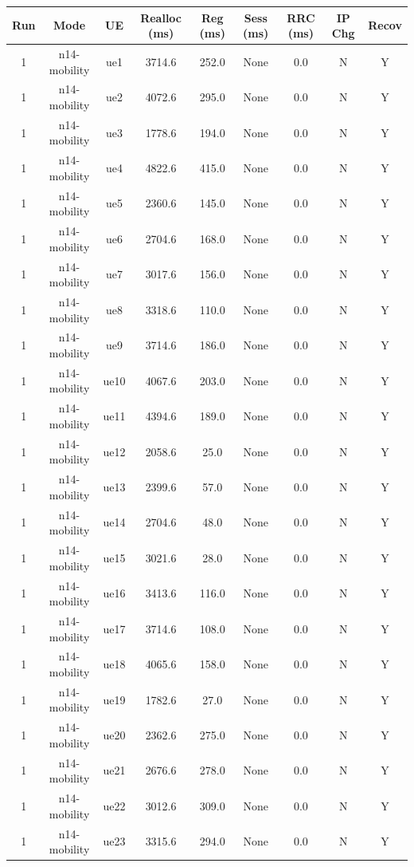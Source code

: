 \begin{table}[ht]
\centering
\begin{tabular}{|c|c|c|c|c|c|c|c|c|}
\hline
Run & Mode & UE & Realloc (ms) & Reg (ms) & Sess (ms) & RRC (ms) & IP Chg & Recov \\
\hline
1 & n14-mobility & ue1 & 3714.6 & 252.0 & None & 0.0 & N & Y \\
1 & n14-mobility & ue2 & 4072.6 & 295.0 & None & 0.0 & N & Y \\
1 & n14-mobility & ue3 & 1778.6 & 194.0 & None & 0.0 & N & Y \\
1 & n14-mobility & ue4 & 4822.6 & 415.0 & None & 0.0 & N & Y \\
1 & n14-mobility & ue5 & 2360.6 & 145.0 & None & 0.0 & N & Y \\
1 & n14-mobility & ue6 & 2704.6 & 168.0 & None & 0.0 & N & Y \\
1 & n14-mobility & ue7 & 3017.6 & 156.0 & None & 0.0 & N & Y \\
1 & n14-mobility & ue8 & 3318.6 & 110.0 & None & 0.0 & N & Y \\
1 & n14-mobility & ue9 & 3714.6 & 186.0 & None & 0.0 & N & Y \\
1 & n14-mobility & ue10 & 4067.6 & 203.0 & None & 0.0 & N & Y \\
1 & n14-mobility & ue11 & 4394.6 & 189.0 & None & 0.0 & N & Y \\
1 & n14-mobility & ue12 & 2058.6 & 25.0 & None & 0.0 & N & Y \\
1 & n14-mobility & ue13 & 2399.6 & 57.0 & None & 0.0 & N & Y \\
1 & n14-mobility & ue14 & 2704.6 & 48.0 & None & 0.0 & N & Y \\
1 & n14-mobility & ue15 & 3021.6 & 28.0 & None & 0.0 & N & Y \\
1 & n14-mobility & ue16 & 3413.6 & 116.0 & None & 0.0 & N & Y \\
1 & n14-mobility & ue17 & 3714.6 & 108.0 & None & 0.0 & N & Y \\
1 & n14-mobility & ue18 & 4065.6 & 158.0 & None & 0.0 & N & Y \\
1 & n14-mobility & ue19 & 1782.6 & 27.0 & None & 0.0 & N & Y \\
1 & n14-mobility & ue20 & 2362.6 & 275.0 & None & 0.0 & N & Y \\
1 & n14-mobility & ue21 & 2676.6 & 278.0 & None & 0.0 & N & Y \\
1 & n14-mobility & ue22 & 3012.6 & 309.0 & None & 0.0 & N & Y \\
1 & n14-mobility & ue23 & 3315.6 & 294.0 & None & 0.0 & N & Y \\

\end{tabular}
\end{table}
